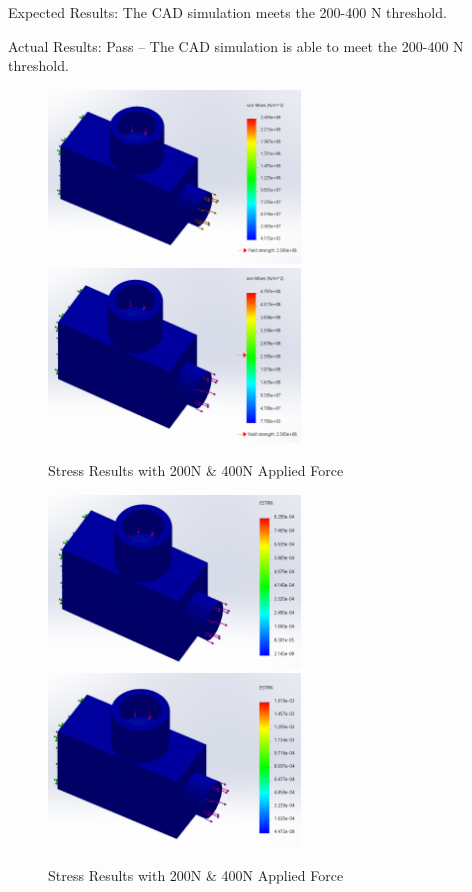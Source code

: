 \documentclass[12pt, titlepage]{article}
\begin{document}
\begin{enumerate}
Expected Results: The CAD simulation meets the 200-400 N threshold. 

Actual Results: Pass -- The CAD simulation is able to meet the 200-400 N threshold. 

\begin{figure}[h!]
\centering
\includegraphics[width=6.7cm]{stress1}
\includegraphics[width=6.7cm]{stress2}
\caption{Stress Results with 200N \& 400N Applied Force}
\end{figure}

\begin{figure}[h!]
\centering
\includegraphics[width=6.7cm]{strain1}
\includegraphics[width=6.7cm]{strain2}
\caption{Stress Results with 200N \& 400N Applied Force}
\end{figure}


\end{enumerate}
\end{document}
